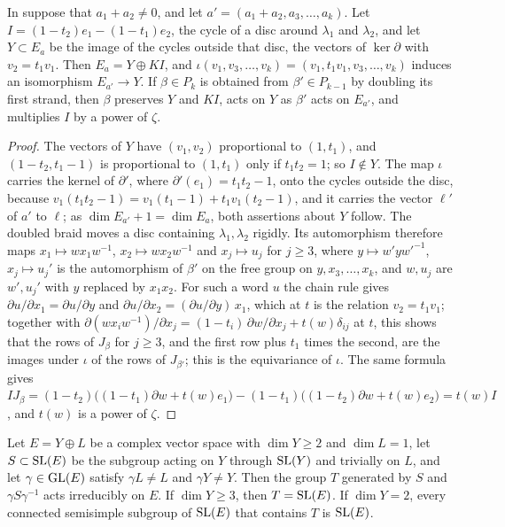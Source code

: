 \begin{lemma}\label{lem:cabling}
In  suppose that $a_{1}+a_{2}\ne0$, and let
$a'=(a_{1}+a_{2},a_{3},\dots,a_{k})$. Let $I=(1-t_{2})e_{1}-(1-t_{1})e_{2}$,
the cycle of a disc around $\lambda_{1}$ and $\lambda_{2}$, and let
$Y\subset E_{a}$ be the image of the cycles outside that disc, the vectors of
$\ker\partial$ with $v_{2}=t_{1}v_{1}$. Then $E_{a}=Y\oplus KI$, and
$\iota(v_{1},v_{3},\dots,v_{k})=(v_{1},t_{1}v_{1},v_{3},\dots,v_{k})$ induces an
isomorphism $E_{a'}\to Y$. If $\beta\in P_{k}$ is obtained from
$\beta'\in P_{k-1}$ by doubling its first strand, then $\beta$ preserves $Y$
and $KI$, acts on $Y$ as $\beta'$ acts on $E_{a'}$, and multiplies $I$ by a
power of $\zeta$.
\end{lemma}

\begin{proof}
The vectors of $Y$ have $(v_{1},v_{2})$ proportional to $(1,t_{1})$, and
$(1-t_{2},t_{1}-1)$ is proportional to $(1,t_{1})$ only if $t_{1}t_{2}=1$; so
$I\notin Y$. The map $\iota$ carries the kernel of $\partial'$, where
$\partial'(e_{1})=t_{1}t_{2}-1$, onto the cycles outside the disc, because
$v_{1}(t_{1}t_{2}-1)=v_{1}(t_{1}-1)+t_{1}v_{1}(t_{2}-1)$, and it carries the
vector $\ell'$ of $a'$ to $\ell$; as $\dim E_{a'}+1=\dim E_{a}$, both
assertions about $Y$ follow. The doubled braid moves a disc containing
$\lambda_{1},\lambda_{2}$ rigidly. Its automorphism therefore maps
$x_{1}\mapsto wx_{1}w^{-1}$, $x_{2}\mapsto wx_{2}w^{-1}$ and $x_{j}\mapsto
u_{j}$ for $j\ge3$, where $y\mapsto w'yw'^{-1}$, $x_{j}\mapsto u_{j}'$ is the
automorphism of $\beta'$ on the free group on $y,x_{3},\dots,x_{k}$, and
$w,u_{j}$ are $w',u_{j}'$ with $y$ replaced by $x_{1}x_{2}$. For such a word
$u$ the chain rule gives $\partial u/\partial x_{1}=\partial u/\partial y$
and $\partial u/\partial x_{2}=(\partial u/\partial y)\,x_{1}$, which at $t$ is
the relation $v_{2}=t_{1}v_{1}$; together with
$\partial(wx_{i}w^{-1})/\partial x_{j}=(1-t_{i})\,\partial w/\partial
x_{j}+t(w)\delta_{ij}$ at $t$, this shows that the rows of $J_{\beta}$ for
$j\ge3$, and the first row plus $t_{1}$ times the second, are the images under
$\iota$ of the rows of $J_{\beta'}$; this is the equivariance of $\iota$. The
same formula gives $IJ_{\beta}=(1-t_{2})\bigl((1-t_{1})\partial w+t(w)e_{1}\bigr)
-(1-t_{1})\bigl((1-t_{2})\partial w+t(w)e_{2}\bigr)=t(w)I$, and $t(w)$ is a
power of $\zeta$.
\end{proof}

\begin{lemma}\label{lem:hyperplanes}
Let $E=Y\oplus L$ be a complex vector space with $\dim Y\ge2$ and
$\dim L=1$, let $S\subset\operatorname{SL}(E)$ be the subgroup acting on $Y$ through
$\operatorname{SL}(Y)$ and trivially on $L$, and let $\gamma\in\operatorname{GL}(E)$ satisfy
$\gamma L\ne L$ and $\gamma Y\ne Y$. Then the group $T$ generated by $S$ and
$\gamma S\gamma^{-1}$ acts irreducibly on $E$. If $\dim Y\ge3$, then
$T=\operatorname{SL}(E)$. If $\dim Y=2$, every connected semisimple subgroup of $\operatorname{SL}(E)$
that contains $T$ is $\operatorname{SL}(E)$.
\end{lemma}

